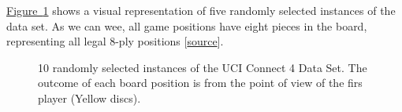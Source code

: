 \documentclass{article}
\newcommand{\GithubURL}[1]{[\href{https://github.com/davidrobles/mlnd-capstone-code/blob/master/#1}{source}]}
\begin{document}
\hyperref[fig:c4-exp]{Figure~\ref*{fig:c4-exp}} shows a visual representation of five randomly
selected instances of the data set. As we can wee, all game positions have eight pieces in the
board, representing all legal 8-ply positions \GithubURL{examples/c4_uci_viz.py}.


\begin{figure}[!t]
    \centering
     \hspace{0.1in}
     \hspace{0.1in}
     \hspace{0.1in}
     \hspace{0.1in}
    \caption{10 randomly selected instances of the UCI Connect 4 Data Set. The outcome of each board
    position is from the point of view of the firs player (Yellow discs).}
    \label{fig:c4-exp}
\end{figure}
\end{document}
